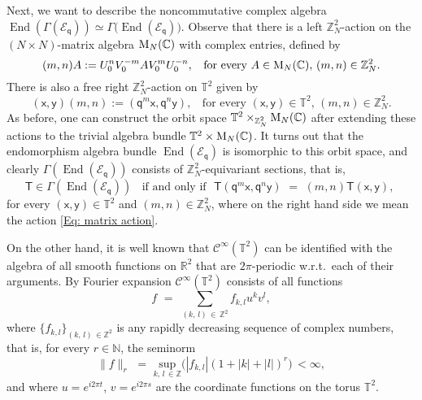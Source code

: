\documentclass[reqno, a4paper, 10pt]{amsart}
\numberwithin{equation}{section}
\theoremstyle{plain}
\theoremstyle{definition}
\theoremstyle{remark}
\begin{document}
Next, we want to describe the noncommutative complex algebra ${\operatorname{End}({\Gamma({{\mathcal E}}_{{\mathsf{{q}}}})})} \simeq \Gamma\big( {\operatorname{End}({{{\mathcal E}}_{{\mathsf{{q}}}}})} \big)$. Observe 
that there is a left $\mathbb{Z}_N^2$-action on  the $(N\times N)$-matrix algebra ${\rm M}_N(\mathbb{C})$ with complex entries, defined by 
\begin{equation}\label{Eq: matrix action}
(m,n) A := U_0^nV_0^{-m}AV_0^{m}U_0^{-n},\;\; \text{ for every  } A \in {\rm M}_N(\mathbb{C}), \, (m,n ) \in \mathbb{Z}_N^2.
\end{equation}
There is also a free right $\mathbb{Z}_N^2$-action on $\mathbb{T}^2$ given by
$$
({\mathsf{{x}}},{\mathsf{{y}}}) (m,n) := ({\mathsf{{q}}}^m{\mathsf{{x}}},{\mathsf{{q}}}^n{\mathsf{{y}}}), \;\; \text{ for every } ({\mathsf{{x}}},{\mathsf{{y}}}) \in \mathbb{T}^2, \, (m,n) \in \mathbb{Z}_N^2.
$$
As before, one can construct 
the orbit space $\mathbb{T}^2 \times_{\mathbb{Z}_N^2} {\rm M}_N(\mathbb{C})$ after extending these actions to the trivial algebra bundle $\mathbb{T}^2 \times {\rm M}_N(\mathbb{C})$.    It turns out that the endomorphism algebra bundle ${\operatorname{End}({{{\mathcal E}}_{{\mathsf{{q}}}}})}$ is isomorphic 
to this orbit space, and clearly $\Gamma({\operatorname{End}({{{\mathcal E}}_{{\mathsf{{q}}}}})})$ consists  of $\mathbb{Z}_N^2$-equivariant sections, that is,
\begin{equation}\label{Eq:T}
{\mathsf{{T}}} \in \Gamma({\operatorname{End}({{{\mathcal E}}_{{\mathsf{{q}}}}})})\;\; \text{ if and only if }\,\, {\mathsf{{T}}}({\mathsf{{q}}}^m{\mathsf{{x}}},{\mathsf{{q}}}^n{\mathsf{{y}}}) \,\,=\,\,(m,n) {\mathsf{{T}}}({\mathsf{{x}}}, {\mathsf{{y}}}),\; 
\end{equation}
for every $({\mathsf{{x}}}, {\mathsf{{y}}}) \in \mathbb{T}^2$ and $ (m,n) \in \mathbb{Z}_N^2$, where on the right hand side we mean the action \eqref{Eq: matrix action}.

On the other hand, it is well known that ${{\mathcal C}}^{\infty}(\mathbb{T}^2)$ 
can be identified with the algebra of all smooth functions on $\mathbb{R}^2$ that are $2\pi$-periodic w.r.t.\ each of their arguments. By Fourier expansion  ${{\mathcal C}}^{\infty}(\mathbb{T}^2)$ consists of all functions
$$
f \,\,=\,\, \sum_{(k,\,l) \, \in \, \mathbb{Z}^2} f_{k,l} u^kv^l,
$$
where $\{f_{k, l}\}_{(k,\,l) \, \in \mathbb{Z}^2}$ is any rapidly decreasing sequence of complex numbers, that is, for every $r \in \mathbb{N}$, the seminorm
\begin{equation}\label{Eq:Frechet}
\| f\|_r\,\,=\,\, \underset{k,\, l\, \in\mathbb{Z}}{\mathrm{sup}}\Big( |f_{k, l}| (1+ |k|+|l|)^r\Big) \, < \infty,
\end{equation}
and where $u=e^{i2\pi t}$, $v=e^{i2\pi s}$ are the coordinate functions on the torus $\mathbb{T}^2$.
\end{document}
